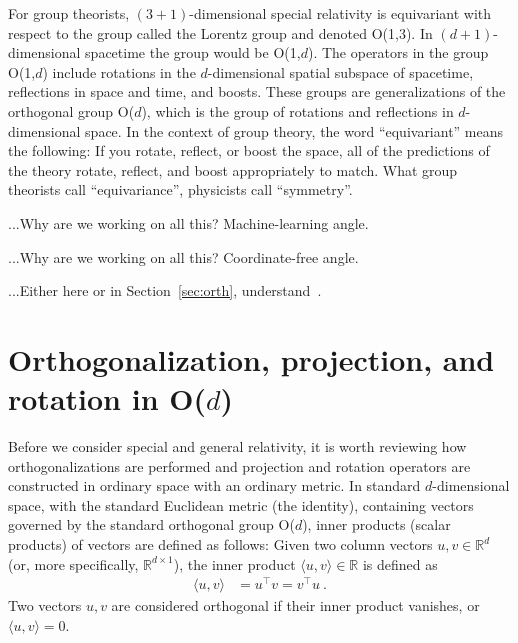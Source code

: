 \documentclass{article}
\newcommand{\inner}[2]{\langle{#1},{#2}\rangle}
\newcommand{\secref}[1]{Section~\ref{#1}}
\begin{document}
For group theorists, $(3+1)$-dimensional special relativity is equivariant with respect to the group called the Lorentz group and denoted O(1,3).
In $(d+1)$-dimensional spacetime the group would be O(1,$d$).
The operators in the group O(1,$d$) include rotations in the $d$-dimensional spatial subspace of spacetime, reflections in space and time, and boosts.
These groups are generalizations of the orthogonal group O($d$), which is the group of rotations and reflections in $d$-dimensional space.
In the context of group theory, the word ``equivariant'' means the following:
If you rotate, reflect, or boost the space, all of the predictions of the theory rotate, reflect, and boost appropriately to match.
What group theorists call ``equivariance'', physicists call ``symmetry''.

...Why are we working on all this? Machine-learning angle.

...Why are we working on all this? Coordinate-free angle.

...Either here or in \secref{sec:orth}, understand~\cite{joot}.

\section{Orthogonalization, projection, and rotation in O($d$)}\label{sec:od}

Before we consider special and general relativity, it is worth reviewing how orthogonalizations are performed and projection and rotation operators are constructed in ordinary space with an ordinary metric.
In standard $d$-dimensional space, with the standard Euclidean metric (the identity), containing vectors governed by the standard orthogonal group O($d$), inner products (scalar products) of vectors are defined as follows:
Given two column vectors $u,v\in\mathbb{R}^d$ (or, more specifically, $\mathbb{R}^{d\times1}$), the inner product $\inner{u}{v}\in\mathbb{R}$ is defined as
\begin{align}
    \inner{u}{v} &= u^\top v = v^\top u ~.
\end{align}
Two vectors $u,v$ are considered orthogonal if their inner product vanishes, or $\inner{u}{v}=0$.
\end{document}
